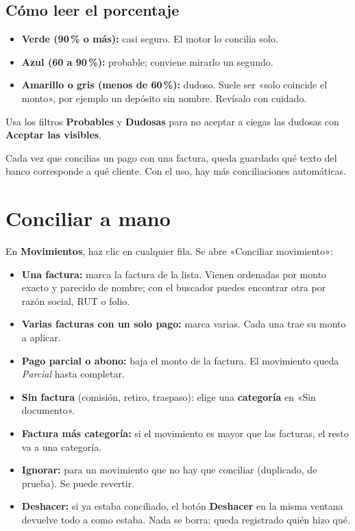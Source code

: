 \documentclass[11pt,a4paper]{article}
\newcommand{\ui}[1]{\textsf{\textbf{#1}}}                       %
\begin{document}
\subsection*{Cómo leer el porcentaje}
\begin{itemize}
\item \textcolor{verde}{\textbf{Verde (90\,\% o más):}} casi seguro. El motor lo concilia solo.
\item \textcolor{azul}{\textbf{Azul (60 a 90\,\%):}} probable; conviene mirarlo un segundo.
\item \textcolor{ambar}{\textbf{Amarillo o gris (menos de 60\,\%):}} dudoso. Suele ser «solo coincide el monto», por ejemplo un depósito sin nombre. Revísalo con cuidado.
\end{itemize}

Usa los filtros \ui{Probables} y \ui{Dudosas} para no aceptar a ciegas las dudosas con \ui{Aceptar las visibles}.

\begin{nota}
Cada vez que concilias un pago con una factura, queda guardado qué texto del banco corresponde a qué cliente. Con el uso, hay más conciliaciones automáticas.
\end{nota}

\section{Conciliar a mano}

En \ui{Movimientos}, haz clic en cualquier fila. Se abre «Conciliar movimiento»:

\begin{itemize}
\item \textbf{Una factura:} marca la factura de la lista. Vienen ordenadas por monto exacto y parecido de nombre; con el buscador puedes encontrar otra por razón social, RUT o folio.
\item \textbf{Varias facturas con un solo pago:} marca varias. Cada una trae su monto a aplicar.
\item \textbf{Pago parcial o abono:} baja el monto de la factura. El movimiento queda \emph{Parcial} hasta completar.
\item \textbf{Sin factura} (comisión, retiro, traspaso): elige una \textbf{categoría} en «Sin documento».
\item \textbf{Factura más categoría:} si el movimiento es mayor que las facturas, el resto va a una categoría.
\item \textbf{Ignorar:} para un movimiento que no hay que conciliar (duplicado, de prueba). Se puede revertir.
\item \textbf{Deshacer:} si ya estaba conciliado, el botón \ui{Deshacer} en la misma ventana devuelve todo a como estaba. Nada se borra: queda registrado quién hizo qué.
\end{itemize}
\end{document}
